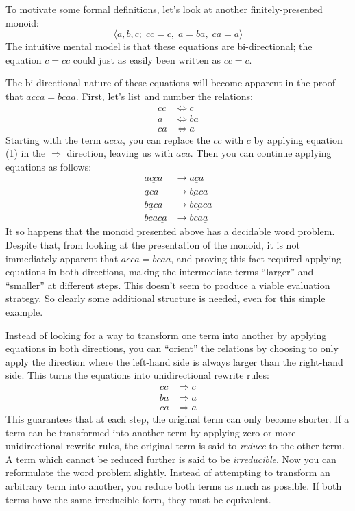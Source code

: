 \documentclass[headsepline,bibliography=totoc]{scrreport}
\theoremstyle{definition}
\theoremstyle{definition}
\theoremstyle{definition}
\begin{document}
To motivate some formal definitions, let's look at another finitely-presented monoid:
\[\langle a,b,c;\; cc=c,\; a=ba,\; ca=a\rangle\]
The intuitive mental model is that these equations are bi-directional; the equation $c=cc$ could just as easily been written as $cc=c$.

The bi-directional nature of these equations will become apparent in the proof that $acca=bcaa$. First, let's list and number the relations:
\begin{align}
cc&\Longleftrightarrow c\tag{1}\\
a&\Longleftrightarrow ba\tag{2}\\
ca&\Longleftrightarrow a\tag{3}
\end{align}
Starting with the term $acca$, you can replace the $cc$ with $c$ by applying equation (1) in the $\Rightarrow$ direction, leaving us with $aca$. Then you can continue applying equations as follows:
\begin{align}
a\underline{cc}a&\rightarrow a\underline{c}a\tag{Eq 1, $\Rightarrow$}\\
\underline{a}ca&\rightarrow \underline{ba}ca\tag{Eq 2, $\Rightarrow$}\\
b\underline{a}ca&\rightarrow b\underline{ca}ca\tag{Eq 3, $\Leftarrow$}\\
bca\underline{ca}&\rightarrow bca\underline{a}\tag{Eq 3, $\Rightarrow$}
\end{align}
It so happens that the monoid presented above has a decidable word problem. Despite that, from looking at the presentation of the monoid, it is not immediately apparent that $acca=bcaa$, and proving this fact required applying equations in both directions, making the intermediate terms ``larger'' and ``smaller'' at different steps. This doesn't seem to produce a viable evaluation strategy. So clearly some additional structure is needed, even for this simple example.

Instead of looking for a way to transform one term into another by applying equations in both directions, you can ``orient'' the relations by choosing to only apply the direction where the left-hand side is always larger than the right-hand side. This turns the equations into unidirectional rewrite rules:
\begin{align}
cc&\Longrightarrow c\tag{1}\\
ba&\Longrightarrow a\tag{2}\\
ca&\Longrightarrow a\tag{3}
\end{align}
This guarantees that at each step, the original term can only become shorter. If a term can be transformed into another term by applying zero or more unidirectional rewrite rules, the original term is said to \emph{reduce} to the other term. A term which cannot be reduced further is said to be \emph{irreducible}. Now you can reformulate the word problem slightly. Instead of attempting to transform an arbitrary term into another, you reduce both terms as much as possible. If both terms have the same irreducible form, they must be equivalent.
\end{document}
